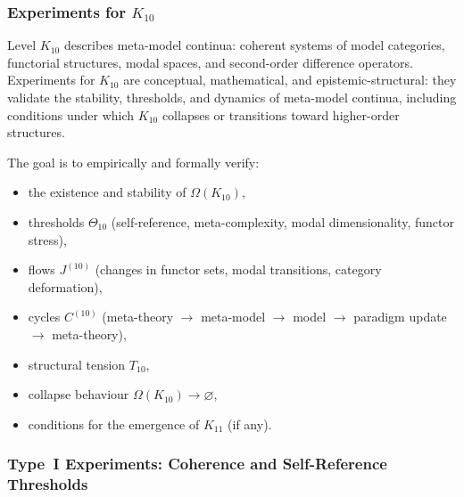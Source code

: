 
\subsubsection{Experiments for $K_{10}$}
\label{sec:experiments-k10}

Level $K_{10}$ describes meta-model continua: coherent systems of 
model categories, functorial structures, modal spaces, and 
second-order difference operators.  
Experiments for $K_{10}$ are conceptual, mathematical, and 
epistemic-structural: they validate the stability, thresholds, 
and dynamics of meta-model continua, including conditions under which 
$K_{10}$ collapses or transitions toward higher-order structures.

The goal is to empirically and formally verify:

\begin{itemize}
    \item the existence and stability of $\Omega(K_{10})$,
    \item thresholds $\Theta_{10}$ (self-reference, meta-complexity, 
          modal dimensionality, functor stress),
    \item flows $J^{(10)}$ (changes in functor sets, modal transitions, 
          category deformation),
    \item cycles $C^{(10)}$ (meta-theory $\to$ meta-model $\to$ model 
          $\to$ paradigm update $\to$ meta-theory),
    \item structural tension $T_{10}$,
    \item collapse behaviour $\Omega(K_{10}) \to \varnothing$,
    \item conditions for the emergence of $K_{11}$ (if any).
\end{itemize}



\subsubsection{Type~I Experiments: Coherence and Self-Reference Thresholds}

